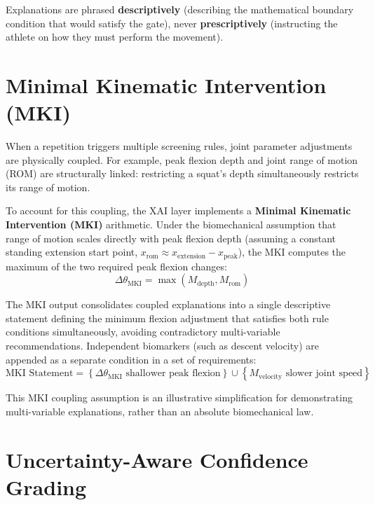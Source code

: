 Explanations are phrased \textbf{descriptively} (describing the mathematical boundary condition that would satisfy the gate), never \textbf{prescriptively} (instructing the athlete on how they must perform the movement).



\section{Minimal Kinematic Intervention (MKI)}
\label{sec:12-5-minimal-kinematic-intervention-mki}


When a repetition triggers multiple screening rules, joint parameter adjustments are physically coupled. For example, peak flexion depth and joint range of motion (ROM) are structurally linked: restricting a squat's depth simultaneously restricts its range of motion.

To account for this coupling, the XAI layer implements a \textbf{Minimal Kinematic Intervention (MKI)} arithmetic. Under the biomechanical assumption that range of motion scales directly with peak flexion depth (assuming a constant standing extension start point, $x_{\text{rom}} \approx x_{\text{extension}} - x_{\text{peak}}$), the MKI computes the maximum of the two required peak flexion changes:
\begin{equation}
  \Delta \theta_{\text{MKI}} = \max(M_{\text{depth}}, M_{\text{rom}})
  \label{eq:disp4}
\end{equation}

The MKI output consolidates coupled explanations into a single descriptive statement defining the minimum flexion adjustment that satisfies both rule conditions simultaneously, avoiding contradictory multi-variable recommendations. Independent biomarkers (such as descent velocity) are appended as a separate condition in a set of requirements:
\begin{equation}
  \text{MKI Statement} = \left\{ \Delta \theta_{\text{MKI}} \text{ shallower peak flexion} \right\} \cup \left\{ M_{\text{velocity}} \text{ slower joint speed} \right\}
  \label{eq:disp5}
\end{equation}

This MKI coupling assumption is an illustrative simplification for demonstrating multi-variable explanations, rather than an absolute biomechanical law.



\section{Uncertainty-Aware Confidence Grading}
\label{sec:12-6-uncertainty-aware-confidence-grading}


